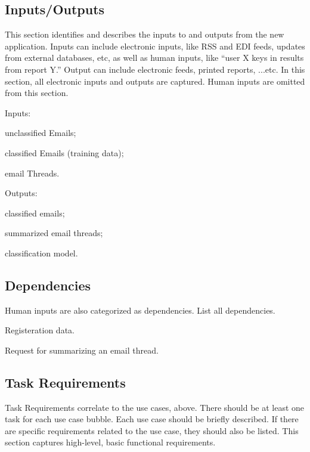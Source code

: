 \documentclass[a4paper,10pt]{article}
\newenvironment{my_itemize}
{\begin{itemize}
  \setlength{\itemsep}{0cm}
  \setlength{\parskip}{0cm}}
{\end{itemize}}
\newenvironment{my_enumerate}
{\begin{enumerate}
  \setlength{\itemsep}{0cm}
  \setlength{\parskip}{0cm}}
{\end{enumerate}}
\begin{document}
\subsection{Inputs/Outputs}
This section identifies and describes the inputs to and outputs from the new 
application. Inputs can include electronic inputs, like RSS and EDI feeds, 
updates from external databases, etc, as well as human inputs, like 
``user X keys in results from report Y.'' Output can include electronic feeds, 
printed reports, ...etc. In this section, all electronic inputs and outputs 
are captured. Human inputs are omitted from this section.

\begin{my_enumerate}
  \item Inputs:
  \begin{my_itemize}
    \item unclassified Emails;
    \item classified Emails (training data);
    \item email Threads.
  \end{my_itemize}
  \item Outputs:
  \begin{my_itemize}
    \item classified emails;
    \item summarized email threads;
    \item classification model.
  \end{my_itemize}
\end{my_enumerate}


\subsection{Dependencies}
Human inputs are also categorized as dependencies. List all dependencies.

\begin{my_enumerate}
  \item Registeration data.
  \item Request for summarizing an email thread.
\end{my_enumerate}


\subsection{Task Requirements}
Task Requirements correlate to the use cases, above. There should be at least 
one task for each use case bubble. Each use case should be briefly described. 
If there are specific requirements related to the use case, they should also 
be listed. This section captures high-level, basic functional requirements.
\end{document}
